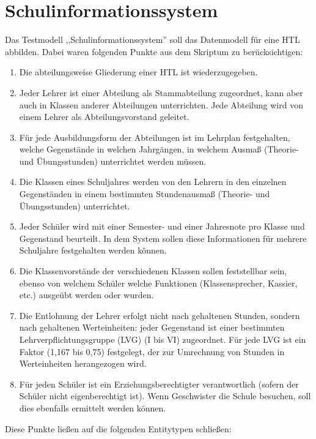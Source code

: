 \section{Schulinformationssystem}
\prc

Das Testmodell ,,Schulinformationssystem'' soll das Datenmodell für eine HTL abbilden. Dabei waren folgenden Punkte aus dem Skriptum \cite{skriptum} zu berücksichtigen:

\begin{enumerate}
	\item Die abteilungsweise Gliederung einer HTL ist wiederzugegeben.
	\item Jeder Lehrer ist einer Abteilung als Stammabteilung zugeordnet, kann aber auch in Klassen anderer Abteilungen unterrichten. Jede Abteilung wird von einem Lehrer als Abteilungsvorstand geleitet.
	\item Für jede Ausbildungsform der Abteilungen ist im Lehrplan festgehalten, welche Gegenstände in welchen
	Jahrgängen, in welchem Ausmaß (Theorie- und Übungsstunden) unterrichtet werden müssen.
	\item Die Klassen eines Schuljahres werden von den Lehrern in den einzelnen Gegenständen in einem bestimmten
	Stundenausmaß (Theorie- und Übungsstunden) unterrichtet.
	\item Jeder Schüler wird mit einer Semester- und einer Jahresnote pro Klasse und Gegenstand beurteilt. In dem
	System sollen diese Informationen für mehrere Schuljahre festgehalten werden können.
	\item Die Klassenvorstände der verschiedenen Klassen sollen feststellbar sein, ebenso von welchem Schüler welche Funktionen (Klassensprecher, Kassier, etc.) ausgeübt werden oder wurden.
	\item Die Entlohnung der Lehrer erfolgt nicht nach gehaltenen Stunden, sondern nach gehaltenen Werteinheiten:
	jeder Gegenstand ist einer bestimmten Lehrverpflichtungsgruppe (LVG) (I bis VI) zugeordnet. Für jede LVG
	ist ein Faktor (1,167 bis 0,75) festgelegt, der zur Umrechnung von Stunden in Werteinheiten herangezogen
	wird.
	\item Für jeden Schüler ist ein Erziehungsberechtigter verantwortlich (sofern der Schüler nicht eigenberechtigt
	ist). Wenn Geschwister die Schule besuchen, soll dies ebenfalls ermittelt werden können.
	\\
\end{enumerate} 

\noindent
Diese Punkte ließen auf die folgenden Entitytypen schließen:

